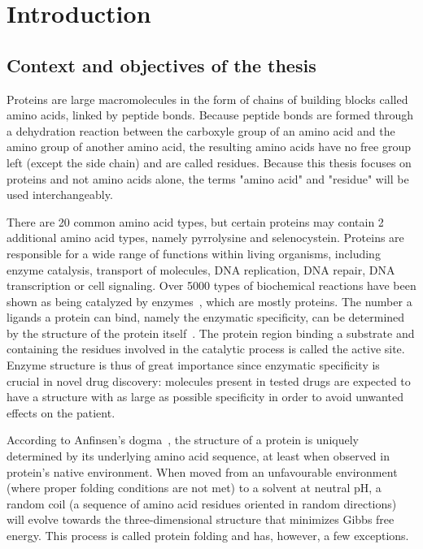 \chapter{Introduction}

\section{Context and objectives of the thesis}

    \setcounter{page}{1}
    \vspace*{0.5cm}

    Proteins are large macromolecules in the form of chains of building blocks called amino acids,
    linked by peptide bonds. Because peptide bonds are formed through a dehydration reaction between
    the carboxyle group of an amino acid and the amino group of another amino acid,
    the resulting amino acids have no free group left (except the side chain) and are
    called residues. Because this thesis focuses on proteins and not amino acids alone,
    the terms "amino acid" and "residue" will be used interchangeably.

    There are 20 common amino acid types, but certain proteins may contain 2
    additional amino acid types, namely pyrrolysine and selenocystein.
    Proteins are responsible for a wide range of functions within living organisms, including
    enzyme catalysis, transport of molecules, DNA replication, DNA repair, DNA transcription or cell signaling.
    Over 5000 types of biochemical reactions have been shown as being catalyzed by enzymes~\cite{schomburg2012brenda},
    which are mostly proteins. The number a ligands a protein can bind, namely the enzymatic specificity,
    can be determined by the structure of the protein itself~\cite{pi2004determination}.
    The protein region binding a substrate and containing
    the residues involved in the catalytic process is called the active site.
    Enzyme structure is thus of great importance since enzymatic specificity is crucial in novel drug discovery:
    molecules present in tested drugs are expected to have a structure with as large as possible specificity
    in order to avoid unwanted effects on the patient.

    According to Anfinsen's dogma~\cite{anfinsen1973principles}, the structure of a protein is uniquely
    determined by its underlying amino acid sequence,
    at least when observed in protein's native environment.
    When moved from an unfavourable environment (where proper folding conditions are not met)
    to a solvent at neutral pH, a random coil (a sequence of amino acid residues
    oriented in random directions) will evolve towards the three-dimensional structure that minimizes Gibbs free energy.
    This process is called protein folding and has, however, a few exceptions.

